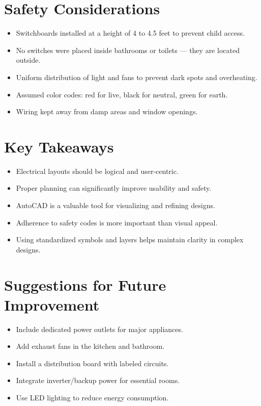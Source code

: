 \documentclass[12pt]{article}
\begin{document}
\section*{Safety Considerations}
\begin{itemize}
    \item Switchboards installed at a height of 4 to 4.5 feet to prevent child access.
    \item No switches were placed inside bathrooms or toilets — they are located outside.
    \item Uniform distribution of light and fans to prevent dark spots and overheating.
    \item Assumed color codes: red for live, black for neutral, green for earth.
    \item Wiring kept away from damp areas and window openings.
\end{itemize}

\section*{Key Takeaways}
\begin{itemize}
    \item Electrical layouts should be logical and user-centric.
    \item Proper planning can significantly improve usability and safety.
    \item AutoCAD is a valuable tool for visualizing and refining designs.
    \item Adherence to safety codes is more important than visual appeal.
    \item Using standardized symbols and layers helps maintain clarity in complex designs.
\end{itemize}

\section*{Suggestions for Future Improvement}
\begin{itemize}
    \item Include dedicated power outlets for major appliances.
    \item Add exhaust fans in the kitchen and bathroom.
    \item Install a distribution board with labeled circuits.
    \item Integrate inverter/backup power for essential rooms.
    \item Use LED lighting to reduce energy consumption.
\end{itemize}
\end{document}
